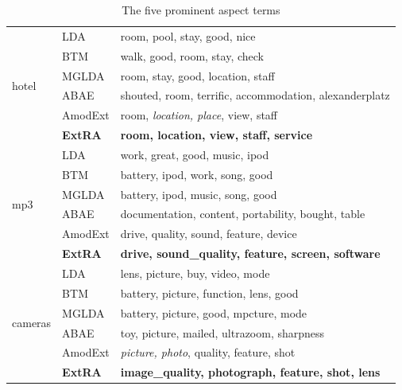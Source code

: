 \begin{table}[th]
	\scriptsize
	\centering
	\caption{The five prominent aspect terms}
	\label{table:aspect_words}
	\begin{tabular}{|p{0.8cm}<{\centering}|p{0.79cm}<{\centering}|p{4.83cm}|}
		\hline
		\multirow{6}{*}{hotel} & LDA     & room, pool, stay, good, nice                           \\ \cline{2-3} 
		& BTM     & walk, good, room, stay, check                          \\ \cline{2-3} 
		& MGLDA   & room, stay, good, location, staff                      \\ \cline{2-3} 
		& ABAE    & shouted, room, terrific, accommodation, alexanderplatz \\ \cline{2-3} 
		& AmodExt & room, \textit{location, place}, view, staff                     \\ \cline{2-3} 
		& \textbf{ExtRA}   & \textbf{room, location, view, staff, service}                   \\ \hline
		\multirow{6}{*}{mp3}      & LDA     & work, great, good, music, ipod                         \\ \cline{2-3} 
		& BTM     & battery, ipod, work, song, good                        \\ \cline{2-3} 
		& MGLDA   & battery, ipod, music, song, good                       \\ \cline{2-3} 
		& ABAE    & documentation, content, portability, bought, table     \\ \cline{2-3} 
		& AmodExt & drive, quality, sound, feature, device                 \\ \cline{2-3} 
		& \textbf{ExtRA}   & \textbf{drive, sound\_quality, feature, screen, software}       \\ \hline
		\multirow{6}{*}{cameras}      & LDA     & lens, picture, buy, video, mode                        \\ \cline{2-3} 
		& BTM     & battery, picture, function, lens, good                 \\ \cline{2-3} 
		& MGLDA   & battery, picture, good, mpcture, mode                  \\ \cline{2-3} 
		& ABAE    & toy, picture, mailed, ultrazoom, sharpness             \\ \cline{2-3} 
		& AmodExt & \textit{picture, photo}, quality, feature, shot                 \\ \cline{2-3} 
		& \textbf{ExtRA}   & \textbf{image\_quality, photograph, feature, shot, lens}        \\ \hline

\end{tabular}
\end{table}
